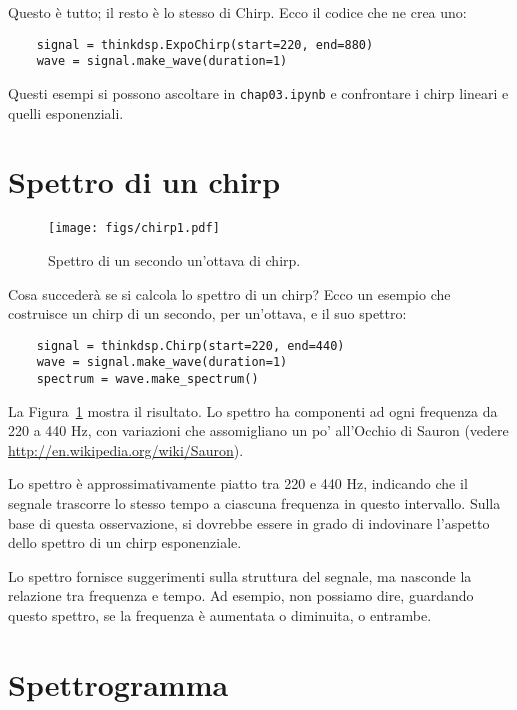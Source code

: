\documentclass[12pt,a4paper]{book}
\begin{document}
Questo è tutto; il resto è lo stesso di Chirp. Ecco il codice che ne crea uno:

\begin{verbatim} 
    signal = thinkdsp.ExpoChirp(start=220, end=880)
    wave = signal.make_wave(duration=1)
 \end{verbatim} 

Questi esempi si possono ascoltare in {\tt chap03.ipynb} e confrontare i chirp lineari e quelli esponenziali.

\section{Spettro di un chirp} \label{sauron} 

\begin{figure} 

\centerline{\texttt{[image: figs/chirp1.pdf]}} \caption{Spettro di un secondo un'ottava di chirp.} \label{fig.chirp1} \end{figure} 

Cosa succederà se si calcola lo spettro di un chirp? Ecco un esempio che costruisce un chirp di un secondo, per un'ottava, e il suo spettro:

\begin{verbatim} 
    signal = thinkdsp.Chirp(start=220, end=440)
    wave = signal.make_wave(duration=1)
    spectrum = wave.make_spectrum()
 \end{verbatim} 

La Figura~\ref{fig.chirp1} mostra il risultato. Lo spettro ha componenti ad ogni frequenza da 220 a 440 Hz, con variazioni che assomigliano un po' all'Occhio di Sauron (vedere \url{http://en.wikipedia.org/wiki/Sauron}).

Lo spettro è approssimativamente piatto tra 220 e 440 Hz, indicando che il segnale trascorre lo stesso tempo a ciascuna frequenza in questo intervallo. Sulla base di questa osservazione, si dovrebbe essere in grado di indovinare l'aspetto dello spettro di un chirp esponenziale.

Lo spettro fornisce suggerimenti sulla struttura del segnale, ma nasconde la relazione tra frequenza e tempo. Ad esempio, non possiamo dire, guardando questo spettro, se la frequenza è aumentata o diminuita, o entrambe.

\section{Spettrogramma} 
\end{document}

